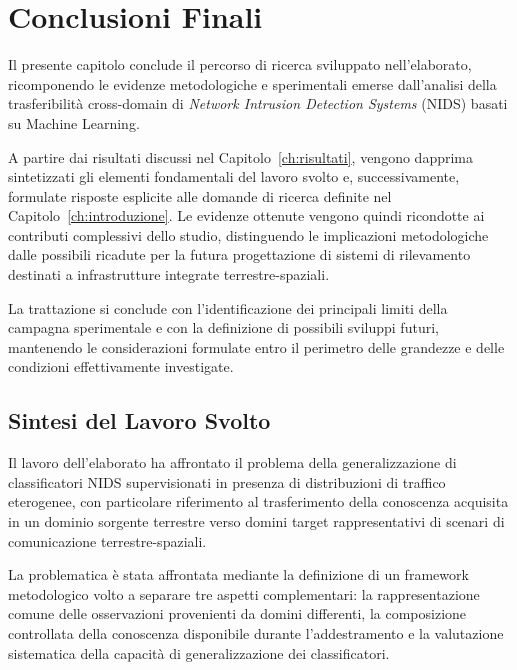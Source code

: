 \chapter{Conclusioni Finali}
\label{ch:conclusioni}

Il presente capitolo conclude il percorso di ricerca sviluppato nell'elaborato, ricomponendo le evidenze metodologiche e sperimentali emerse dall'analisi della trasferibilità cross-domain di \textit{Network Intrusion Detection Systems} (NIDS) basati su Machine Learning.

A partire dai risultati discussi nel Capitolo~\ref{ch:risultati}, vengono dapprima sintetizzati gli elementi fondamentali del lavoro svolto e, successivamente, formulate risposte esplicite alle domande di ricerca definite nel Capitolo~\ref{ch:introduzione}. 
Le evidenze ottenute vengono quindi ricondotte ai contributi complessivi dello studio, distinguendo le implicazioni metodologiche dalle possibili ricadute per la futura progettazione di sistemi di rilevamento destinati a infrastrutture integrate terrestre-spaziali.

La trattazione si conclude con l'identificazione dei principali limiti della campagna sperimentale e con la definizione di possibili sviluppi futuri, mantenendo le considerazioni formulate entro il perimetro delle grandezze e delle condizioni effettivamente investigate.




\section{Sintesi del Lavoro Svolto}
\label{sec:sintesi_lavoro}

Il lavoro dell'elaborato ha affrontato il problema della generalizzazione di classificatori NIDS supervisionati in presenza di distribuzioni di traffico eterogenee, con particolare riferimento al trasferimento della conoscenza acquisita in un dominio sorgente terrestre verso domini target rappresentativi di scenari di comunicazione terrestre-spaziali.

La problematica è stata affrontata mediante la definizione di un framework metodologico volto a separare tre aspetti complementari: la rappresentazione comune delle osservazioni provenienti da domini differenti, la composizione controllata della conoscenza disponibile durante l'addestramento e la valutazione sistematica della capacità di generalizzazione dei classificatori.

